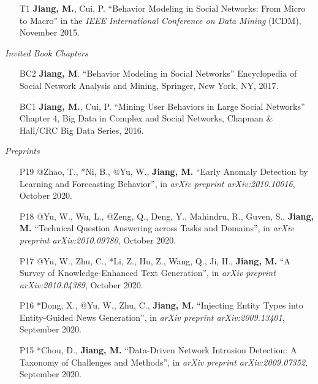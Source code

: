 \documentclass[10pt]{article}
\newenvironment{myindentpar}[1]%
{\begin{list}{}%
         {\setlength{\leftmargin}{#1}}%
         \item[]%
}
{\end{list}}
\newcounter{list}
\begin{document}
\begin{myindentpar}{0.00cm}
\begin{enumerate}[leftmargin=.5cm]
\item[T1] \textbf{Jiang, M.}, Cui, P. ``Behavior Modeling in Social Networks: From Micro to Macro'' in the \textit{IEEE International Conference on Data Mining} (ICDM), November 2015.

\end{enumerate}

\hspace{-0.25cm}\textit{Invited Book Chapters}

\begin{enumerate}[leftmargin=.5cm]

\item[BC2] \textbf{Jiang, M}. ``Behavior Modeling in Social Networks'' Encyclopedia of Social Network Analysis and Mining, Springer, New York, NY, 2017.
		
\item[BC1] \textbf{Jiang, M.}, Cui, P. ``Mining User Behaviors in Large Social Networks'' Chapter 4, Big Data in Complex and Social Networks, Chapman \& Hall/CRC Big Data Series, 2016.

\end{enumerate}

\hspace{-0.25cm}\textit{Preprints}

\begin{enumerate}[leftmargin=.5cm]
	
\item[P19] @Zhao, T., *Ni, B., @Yu, W., \textbf{Jiang, M.} ``Early Anomaly Detection by Learning and Forecasting Behavior'', in \textit{arXiv preprint arXiv:2010.10016}, October 2020.

\item[P18] @Yu, W., Wu, L., @Zeng, Q., Deng, Y., Mahindru, R., Guven, S., \textbf{Jiang, M.} ``Technical Question Answering across Tasks and Domains'', in \textit{arXiv preprint arXiv:2010.09780}, October 2020.

\item[P17] @Yu, W., Zhu, C., *Li, Z., Hu, Z., Wang, Q., Ji, H., \textbf{Jiang, M.} ``A Survey of Knowledge-Enhanced Text Generation'', in \textit{arXiv preprint arXiv:2010.04389}, October 2020.
		
\item[P16] *Dong, X., @Yu, W., Zhu, C., \textbf{Jiang, M.} ``Injecting Entity Types into Entity-Guided News Generation'', in \textit{arXiv preprint arXiv:2009.13401}, September 2020.
		
\item[P15] *Chou, D., \textbf{Jiang, M.} ``Data-Driven Network Intrusion Detection: A Taxonomy of Challenges and Methods'', in \textit{arXiv preprint arXiv:2009.07352}, September 2020.


\end{enumerate}
\end{myindentpar}
\end{document}
